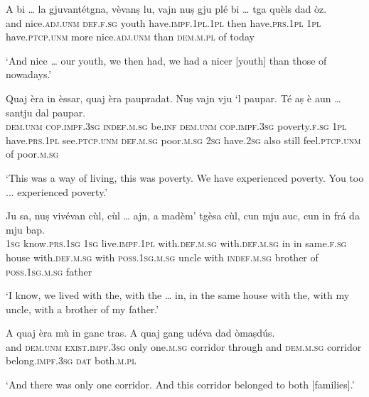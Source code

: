 \begin{linenumbers}
\gll    A bi … la gjuvantétgna, vèvanṣ lu, vajn nuṣ gju plé bi … tga quèls dad òz.\\
and nice.\textsc{adj.unm} {} \textsc{def.f.sg} youth have.\textsc{impf.1pl.1pl} then have.\textsc{prs.1pl} \textsc{1pl} have.\textsc{ptcp.unm} more nice.\textsc{adj.unm} {} than \textsc{dem.m.pl} of today\\
\end{linenumbers}
\medskip
\glt `And nice … our youth, we then had, we had a nicer [youth] than those of nowadays.'
\medskip

\begin{linenumbers}
\gll    Quaj èra in èssar, quaj èra paupradat. Nuṣ vajn vju `l paupar. Té aṣ è aun … santju dal paupar.\\
 \textsc{dem.unm} \textsc{cop.impf.3sg} \textsc{indef.m.sg} be.\textsc{inf}  \textsc{dem.unm} \textsc{cop.impf.3sg} poverty.\textsc{f.sg} \textsc{1pl} have.\textsc{prs.1pl} see.\textsc{ptcp.unm} \textsc{def.m.sg} poor.\textsc{m.sg} \textsc{2sg} have.\textsc{2sg} also still {} feel.\textsc{ptcp.unm} of poor.\textsc{m.sg}\\
\end{linenumbers}
\medskip
\glt `This was a way of living, this was poverty. We have experienced poverty. You too ... experienced poverty.'
\medskip

\begin{linenumbers}
\gll    Ju sa, nuṣ vivévan  cùl, cùl … ajn, a madèm' tgèsa cùl, cun mju auc, cun in frá da mju bap.\\
 \textsc{1sg} know.\textsc{prs.1sg} \textsc{1sg} live.\textsc{impf.1pl} with.\textsc{def.m.sg} with.\textsc{def.m.sg} {} in in same.\textsc{f.sg} house with.\textsc{def.m.sg} with \textsc{poss.1sg.m.sg} uncle with \textsc{indef.m.sg} brother of \textsc{poss.1sg.m.sg} father\\
\end{linenumbers}
\medskip
\glt `I know, we lived with the, with the … in, in the same house with the, with my uncle, with a brother of my father.'
\medskip

\begin{linenumbers}
\gll    A quaj èra mù in ganc tras. A quaj gang udéva dad òmaṣdús.\\
and \textsc{dem.unm} \textsc{exist.impf.3sg} only one.\textsc{m.sg} corridor through and \textsc{dem.m.sg} corridor belong.\textsc{impf.3sg} \textsc{dat} both.\textsc{m.pl}\\
\end{linenumbers}
\medskip
\glt `And there was only one corridor. And this corridor belonged to both [families].'
\medskip

